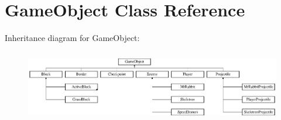\hypertarget{class_game_object}{}\section{Game\+Object Class Reference}
\label{class_game_object}
Inheritance diagram for Game\+Object\+:\begin{figure}[H]
\begin{center}
\leavevmode
\includegraphics[height=3.174603cm]{class_game_object}
\end{center}
\end{figure}
